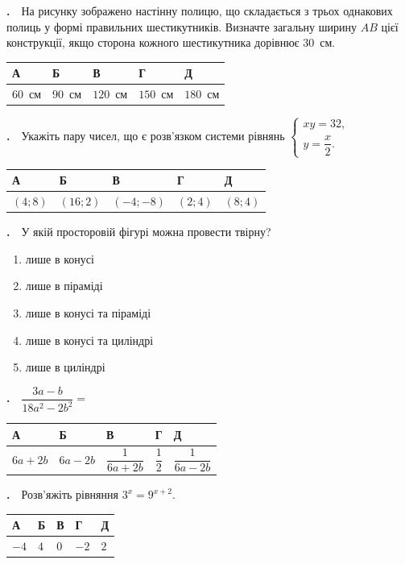 \documentclass[12pt]{article}
\newcommand{\answerTable}[5]{%
\par\vspace{0.15cm}
\noindent
\begin{tabular}{|*{5}{>{\centering\arraybackslash}m{3cm}|}}
\hline
\rule[-0.15cm]{0pt}{0.6cm}\textbf{А} & \rule[-0.15cm]{0pt}{0.6cm}\textbf{Б} & \rule[-0.15cm]{0pt}{0.6cm}\textbf{В} & \rule[-0.15cm]{0pt}{0.6cm}\textbf{Г} & \rule[-0.15cm]{0pt}{0.6cm}\textbf{Д} \\
\hline
\rule[-0.2cm]{0pt}{0.75cm}#1 & \rule[-0.2cm]{0pt}{0.75cm}#2 & \rule[-0.2cm]{0pt}{0.75cm}#3 & \rule[-0.2cm]{0pt}{0.75cm}#4 & \rule[-0.2cm]{0pt}{0.75cm}#5 \\
\hline
\end{tabular}
\par\vspace{0.25cm}
}
\newcommand{\answerTableTall}[5]{%
\par\vspace{0.15cm}
\noindent
\begin{tabular}{|*{5}{>{\centering\arraybackslash}m{3cm}|}}
\hline
\rule[-0.2cm]{0pt}{0.7cm}\textbf{А} & \rule[-0.2cm]{0pt}{0.7cm}\textbf{Б} & \rule[-0.2cm]{0pt}{0.7cm}\textbf{В} & \rule[-0.2cm]{0pt}{0.7cm}\textbf{Г} & \rule[-0.2cm]{0pt}{0.7cm}\textbf{Д} \\
\hline
\rule[-0.45cm]{0pt}{1.2cm}#1 & \rule[-0.45cm]{0pt}{1.2cm}#2 & \rule[-0.45cm]{0pt}{1.2cm}#3 & \rule[-0.45cm]{0pt}{1.2cm}#4 & \rule[-0.45cm]{0pt}{1.2cm}#5 \\
\hline
\end{tabular}
\par\vspace{0.25cm}
}
\newcommand{\hexthree}[2]{%
    \draw[hexcol, line width=1.1pt]
        ($(#1,#2)+(0:30)$) -- ($(#1,#2)+(60:30)$) -- ($(#1,#2)+(120:30)$) --
        ($(#1,#2)+(180:30)$) -- ($(#1,#2)+(240:30)$) -- ($(#1,#2)+(300:30)$) -- cycle;
}
\newcounter{zad}
\newcommand{\zadtask}[1]{\stepcounter{zad}\par\vspace{0.3cm}\noindent\textbf{\thezad.}\ \ #1\par\vspace{0.2cm}}
\newcommand{\zadnum}{\stepcounter{zad}\noindent\textbf{\thezad.}\ \ }
\begin{document}
\noindent
\begin{minipage}[c]{0.52\textwidth}
\zadnum На рисунку зображено настінну полицю, що складається з трьох однакових полиць у формі правильних шестикутників. Визначте загальну ширину $AB$ цієї конструкції, якщо сторона кожного шестикутника дорівнює $30$~см.
\end{minipage}%
\hfill
\begin{minipage}[c]{0.46\textwidth}
\centering
{}
\end{minipage}
\par\vspace{0.2cm}
\answerTable{$60$~см}{$90$~см}{$120$~см}{$150$~см}{$180$~см}

\zadtask{Укажіть пару чисел, що є розв'язком системи рівнянь $\begin{cases}xy = 32,\\ y = \dfrac{x}{2}.\end{cases}$}
\answerTableTall{$(4; 8)$}{$(16; 2)$}{$(-4; -8)$}{$(2; 4)$}{$(8; 4)$}

\zadtask{У якій просторовій фігурі можна провести твірну?
\vspace{0.1cm}
\begin{enumerate}[label=\textbf{\Alph*}, leftmargin=2.8em, itemsep=0.1cm]
    \item лише в конусі
    \item лише в піраміді
    \item лише в конусі та піраміді
    \item лише в конусі та циліндрі
    \item лише в циліндрі
\end{enumerate}
\vspace{0.1cm}}

\zadtask{$\dfrac{3a - b}{18a^2 - 2b^2} = $}
\answerTableTall{$6a + 2b$}{$6a - 2b$}{$\dfrac{1}{6a + 2b}$}{$\dfrac{1}{2}$}{$\dfrac{1}{6a - 2b}$}

\zadtask{Розв'яжіть рівняння $3^x = 9^{x+2}$.}
\answerTable{$-4$}{$4$}{$0$}{$-2$}{$2$}
\end{document}
